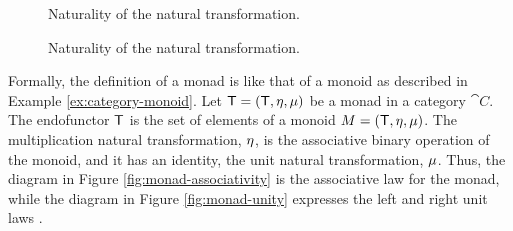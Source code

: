 \begin{definition}
\begin{figure}[htb]
\begin{center}
    \end{center}
    \caption{Naturality of the \nat{\eta} natural transformation.}
    \label{fig:monad-naturality-unit}
  \end{figure}

  \begin{figure}[htb]
    \begin{center}
    \end{center}
    \caption{Naturality of the \nat{\mu} natural transformation.}
    \label{fig:monad-naturality-multiplication}
  \end{figure}

\end{definition}

\begin{remark}
  \label{re:monad-monoid}

  Formally, the definition of a monad is like that of a monoid as
  described in Example \ref{ex:category-monoid}. Let $\mathsf{T} =
  (\mathsf{T}, \eta, \mu)$ be a monad in a category
  $\cat{C}$. The endofunctor $\mathsf{T}$ is the set of elements of a
  monoid $M = (\mathsf{T}, \eta, \mu)$. The multiplication
  natural transformation, $\eta$, is the associative binary
  operation of the monoid, and it has an identity, the unit natural
  transformation, $\mu$. Thus, the diagram in Figure
  \ref{fig:monad-associativity} is the associative law for the monad,
  while the diagram in Figure \ref{fig:monad-unity} expresses the left
  and right unit laws \parencite[138]{maclane-1998}.

\end{remark}

